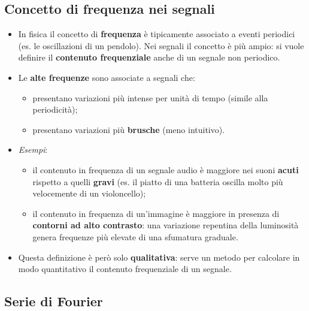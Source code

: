\documentclass[12pt, a4paper]{article}
\begin{document}
\subsection{Concetto di frequenza nei segnali}
\begin{itemize}
    \item In fisica il concetto di \textbf{frequenza} è tipicamente associato a eventi periodici (es. le oscillazioni di un pendolo). Nei segnali il concetto è più ampio: si vuole definire il \textbf{contenuto frequenziale} anche di un segnale non periodico.
    \item Le \textbf{alte frequenze} sono associate a segnali che:
    \begin{itemize}
        \item presentano variazioni più intense per unità di tempo (simile alla periodicità);
        \item presentano variazioni più \textbf{brusche} (meno intuitivo).
    \end{itemize}
    \item \textit{Esempi}:
    \begin{itemize}
        \item il contenuto in frequenza di un segnale audio è maggiore nei suoni \textbf{acuti} rispetto a quelli \textbf{gravi} (es. il piatto di una batteria oscilla molto più velocemente di un violoncello);
        \item il contenuto in frequenza di un'immagine è maggiore in presenza di \textbf{contorni ad alto contrasto}: una variazione repentina della luminosità genera frequenze più elevate di una sfumatura graduale.
    \end{itemize}
    \item Questa definizione è però solo \textbf{qualitativa}: serve un metodo per calcolare in modo quantitativo il contenuto frequenziale di un segnale.
\end{itemize}

\subsection{Serie di Fourier}
\end{document}
